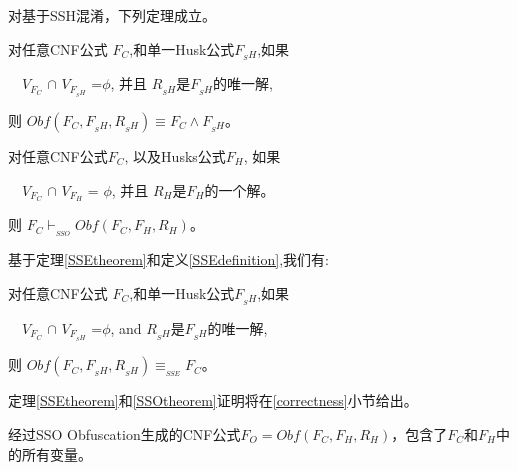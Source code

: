 对基于SSH混淆，下列定理成立。

\begin{theorem}\label{SSEtheorem}

对任意CNF公式 $F_C$,和单一Husk公式$F_{_SH}$,如果

~~$V_{F_C}$ $\cap$ $V_{F_{_SH}}$ =$\phi$, 并且
$R_{_SH}$是$F_{_SH}$的唯一解,

则 $Obf(F_C,F_{_SH},R_{_SH}) \equiv F_C\wedge F_{_SH}$。
\end{theorem}

\begin{theorem}\label{SSOtheorem}

对任意CNF公式$F_C$, 以及Husks公式$F_H$, 如果

~~$V_{F_C}$ $\cap$ $V_{F_H}$ = $\phi$, 并且
$R_H$是$F_H$的一个解。

则 $F_C \vdash_{_{SSO}} Obf(F_C,F_H,R_H)$。
\end{theorem}

基于定理\ref{SSEtheorem}和定义\ref{SSEdefinition},我们有:
\begin{theorem}\label{SSEinference}
对任意CNF公式 $F_C$,和单一Husk公式$F_{_SH}$,如果

~~$V_{F_C}$ $\cap$ $V_{F_{_SH}}$ =$\phi$, and
$R_{_SH}$是$F_{_SH}$的唯一解,

则 $Obf(F_C,F_{_SH},R_{_SH}) \equiv_{_{SSE}} F_C$。
\end{theorem}

定理\ref{SSEtheorem}和\ref{SSOtheorem}证明将在\ref{correctness}小节给出。


经过SSO Obfuscation生成的CNF公式$F_O=Obf(F_C,F_H,R_H)$，包含了$F_C$和$F_H$中的所有变量。

